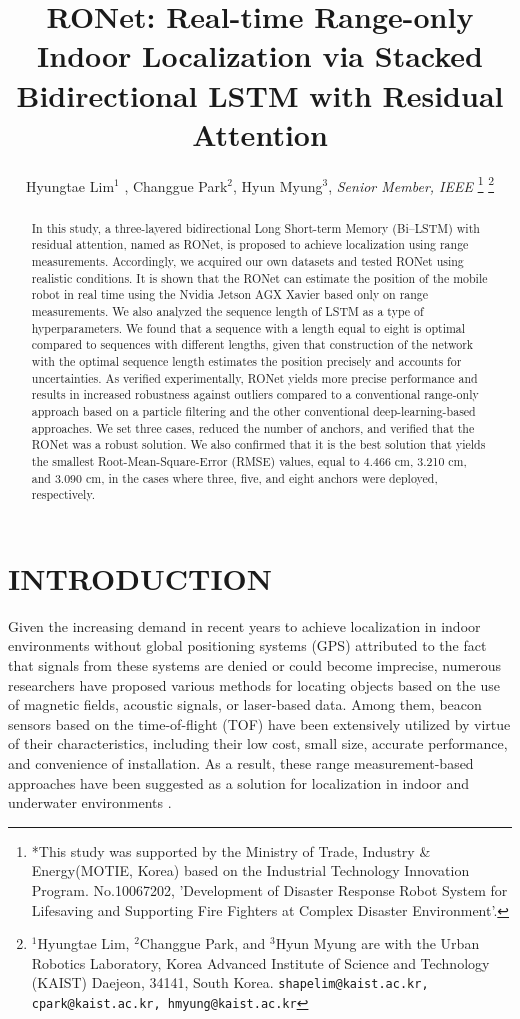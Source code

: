 \documentclass[letterpaper, 10 pt, conference]{ieeeconf}
\title{\LARGE \bf
RONet: Real-time Range-only Indoor Localization via Stacked Bidirectional LSTM with Residual Attention}
\author{Hyungtae Lim$^{1}$ , Changgue Park$^{2}$, Hyun Myung$^{3}$, \textit{Senior Member, IEEE}%
\thanks{
	*This study was supported by the Ministry of Trade, Industry \& Energy(MOTIE, Korea) based on the Industrial Technology Innovation Program. No.10067202, 'Development of Disaster Response Robot System for Lifesaving and Supporting Fire Fighters at Complex Disaster Environment'.}%
\thanks{$^{1}$Hyungtae Lim, $^{2}$Changgue Park, and $^{3}$Hyun Myung are with
	the Urban Robotics Laboratory, Korea Advanced Institute of Science
	and Technology (KAIST) Daejeon, 34141, South Korea. {\tt\small shapelim@kaist.ac.kr, cpark@kaist.ac.kr, hmyung@kaist.ac.kr}}%
%
}
\begin{document}

\maketitle
\thispagestyle{empty}
\pagestyle{empty}

\begin{abstract}

In this study, a three-layered bidirectional Long Short-term Memory (Bi--LSTM) with residual attention, named as RONet, is proposed to achieve localization using range measurements. Accordingly, we acquired our own datasets and tested RONet using realistic conditions. It is shown that the RONet can estimate the position of the mobile robot in real time using the Nvidia Jetson AGX Xavier based only on range measurements. We also analyzed the sequence length of LSTM as a type of hyperparameters. We found that a sequence with a length equal to eight is optimal compared to sequences with different lengths, given that construction of the network with the optimal sequence length estimates the position precisely and accounts for uncertainties. As verified experimentally, RONet yields more precise performance and results in increased robustness against outliers compared to a conventional range-only approach based on a particle filtering and the other conventional deep-learning-based approaches. We set three cases, reduced the number of anchors, and verified that the RONet was a robust solution. We also confirmed that it is the best solution that yields the smallest Root-Mean-Square-Error (RMSE) values, equal to 4.466 cm, 3.210 cm, and 3.090 cm, in the cases where three, five, and eight anchors were deployed, respectively.   

\end{abstract}

\section{INTRODUCTION}

Given the increasing demand in recent years to achieve localization in indoor environments without global positioning systems (GPS) attributed to the fact that signals from these systems are denied or could become imprecise, numerous researchers have proposed various methods for locating objects based on the use of magnetic fields, acoustic signals, or laser-based data\cite{jung2015magnetic,medina2013ultrasound,li2014lidar}. Among them, beacon sensors based on the time-of-flight (TOF) have been extensively utilized by virtue of their characteristics, including their low cost, small size, accurate performance, and convenience of installation. As a result, these range measurement-based approaches have been suggested as a solution for localization in indoor \cite{peneda2009trilateration,jung2011indoor} and underwater environments \cite{newman2003pure, olson2006robust}.
\end{document}
